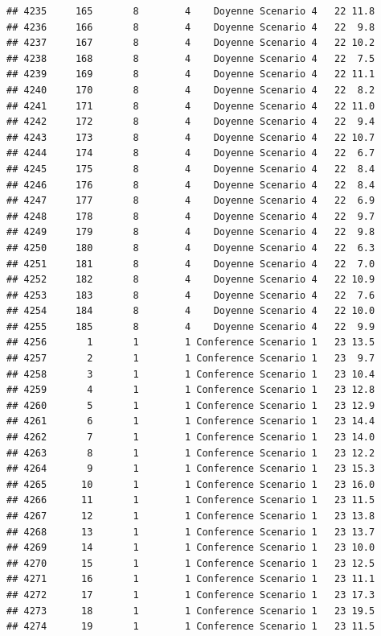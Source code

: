 \documentclass[
]{article}
\begin{document}
\begin{verbatim}
## 4235     165       8        4    Doyenne Scenario 4   22 11.8
## 4236     166       8        4    Doyenne Scenario 4   22  9.8
## 4237     167       8        4    Doyenne Scenario 4   22 10.2
## 4238     168       8        4    Doyenne Scenario 4   22  7.5
## 4239     169       8        4    Doyenne Scenario 4   22 11.1
## 4240     170       8        4    Doyenne Scenario 4   22  8.2
## 4241     171       8        4    Doyenne Scenario 4   22 11.0
## 4242     172       8        4    Doyenne Scenario 4   22  9.4
## 4243     173       8        4    Doyenne Scenario 4   22 10.7
## 4244     174       8        4    Doyenne Scenario 4   22  6.7
## 4245     175       8        4    Doyenne Scenario 4   22  8.4
## 4246     176       8        4    Doyenne Scenario 4   22  8.4
## 4247     177       8        4    Doyenne Scenario 4   22  6.9
## 4248     178       8        4    Doyenne Scenario 4   22  9.7
## 4249     179       8        4    Doyenne Scenario 4   22  9.8
## 4250     180       8        4    Doyenne Scenario 4   22  6.3
## 4251     181       8        4    Doyenne Scenario 4   22  7.0
## 4252     182       8        4    Doyenne Scenario 4   22 10.9
## 4253     183       8        4    Doyenne Scenario 4   22  7.6
## 4254     184       8        4    Doyenne Scenario 4   22 10.0
## 4255     185       8        4    Doyenne Scenario 4   22  9.9
## 4256       1       1        1 Conference Scenario 1   23 13.5
## 4257       2       1        1 Conference Scenario 1   23  9.7
## 4258       3       1        1 Conference Scenario 1   23 10.4
## 4259       4       1        1 Conference Scenario 1   23 12.8
## 4260       5       1        1 Conference Scenario 1   23 12.9
## 4261       6       1        1 Conference Scenario 1   23 14.4
## 4262       7       1        1 Conference Scenario 1   23 14.0
## 4263       8       1        1 Conference Scenario 1   23 12.2
## 4264       9       1        1 Conference Scenario 1   23 15.3
## 4265      10       1        1 Conference Scenario 1   23 16.0
## 4266      11       1        1 Conference Scenario 1   23 11.5
## 4267      12       1        1 Conference Scenario 1   23 13.8
## 4268      13       1        1 Conference Scenario 1   23 13.7
## 4269      14       1        1 Conference Scenario 1   23 10.0
## 4270      15       1        1 Conference Scenario 1   23 12.5
## 4271      16       1        1 Conference Scenario 1   23 11.1
## 4272      17       1        1 Conference Scenario 1   23 17.3
## 4273      18       1        1 Conference Scenario 1   23 19.5
## 4274      19       1        1 Conference Scenario 1   23 11.5

\end{verbatim}
\end{document}
